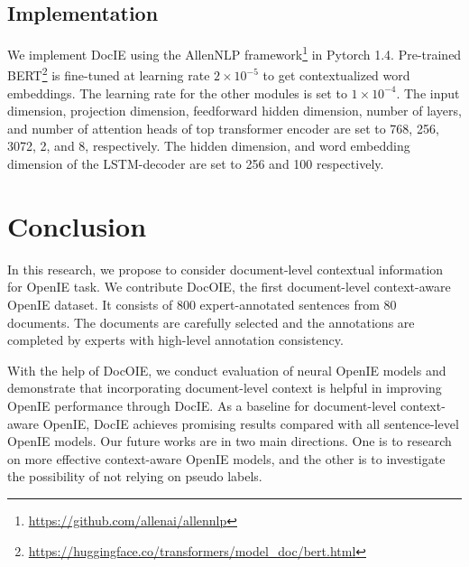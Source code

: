 \documentclass[11pt,a4paper]{article}
\newcommand{\dname}{DocOIE\xspace}
\newcommand{\mname}{DocIE\xspace}
\begin{document}
\subsection{Implementation}
We implement \mname using the AllenNLP framework\footnote{\url{https://github.com/allenai/allennlp}} in Pytorch 1.4. Pre-trained BERT\footnote{\url{https://huggingface.co/transformers/model_doc/bert.html}} is fine-tuned at learning rate $2 \times 10^{-5}$ to get contextualized word embeddings. The learning rate for the other modules is set to $1 \times 10^{-4}$. The input dimension, projection dimension, feedforward hidden dimension, number of layers, and number of attention heads of top transformer encoder are set to 768, 256, 3072, 2, and 8, respectively. The hidden dimension, and word embedding dimension of the LSTM-decoder are set to 256 and 100 respectively.


\section{Conclusion}


In this research, we propose to consider document-level contextual information for OpenIE task. We contribute \dname, the first document-level context-aware OpenIE dataset. It consists of 800 expert-annotated sentences from 80 documents. The documents are carefully selected and the annotations are completed by experts with high-level annotation consistency. 

With the help of \dname, we conduct evaluation of neural OpenIE models and demonstrate that incorporating document-level context is helpful in improving OpenIE performance through \mname.  As a baseline for document-level context-aware OpenIE, \mname achieves promising results compared with all sentence-level OpenIE models. Our future works are in two main directions. One is to research on more effective context-aware OpenIE models, and the other is to investigate the possibility of not relying on pseudo labels.




\end{document}
